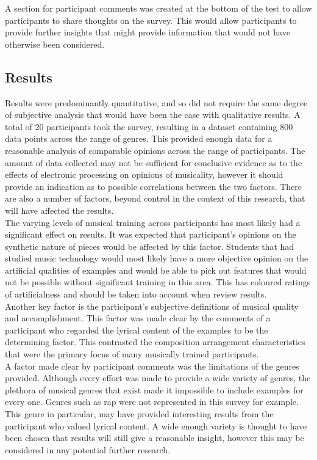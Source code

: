 \documentclass[titlepage]{scrartcl}
\begin{document}
    A section for participant comments was created at the bottom of the test to
    allow participants to share thoughts on the survey. This would allow
    participants to provide further insights that might provide information that
    would not have otherwise been considered.

    \subsection{Results}
    Results were predominantly quantitative, and so did not require the same
    degree of subjective analysis that would have been the case with
    qualitative results.  A total of 20 participants took the survey, resulting
    in a dataset containing 800 data points across the range of genres.  This
    provided enough data for a reasonable analysis of comparable opinions
    across the range of participants. The amount of data collected may not be
    sufficient for conclusive evidence as to the effects of electronic
    processing on opinions of musicality, however it should provide an
    indication as to possible correlations between the two factors.
    There are also a number of factors, beyond control in the context of this
    research, that will have affected the results.\\

    The varying levels of musical training across participants has most likely
    had a significant effect on results. It was expected that participant's
    opinions on the synthetic nature of pieces would be affected by this
    factor. Students that had studied music technology would most likely have a
    more objective opinion on the artificial qualities of examples and would be
    able to pick out features that would not be possible without significant
    training in this area. This has coloured ratings of artificialness and
    should be taken into account when review results.\\

    Another key factor is the participant's subjective definitions of musical
    quality and accomplishment. This factor was made clear by the comments of
    a participant who regarded the lyrical content of the examples to be the
    determining factor. This contrasted the composition arrangement
    characteristics that were the primary focus of many musically trained
    participants.\\
    
    A factor made clear by participant comments was the limitations of
    the genres provided. Although every effort was made to provide a wide
    variety of genres, the plethora of musical genres that exist made it
    impossible to include examples for every one. Genres such as rap were not
    represented in this survey for example. This genre in particular, may have
    provided interesting results from the participant who valued lyrical
    content. A wide enough variety is thought to have been chosen that results
    will still give a reasonable insight, however this may be considered in any
    potential further research.
\end{document}
